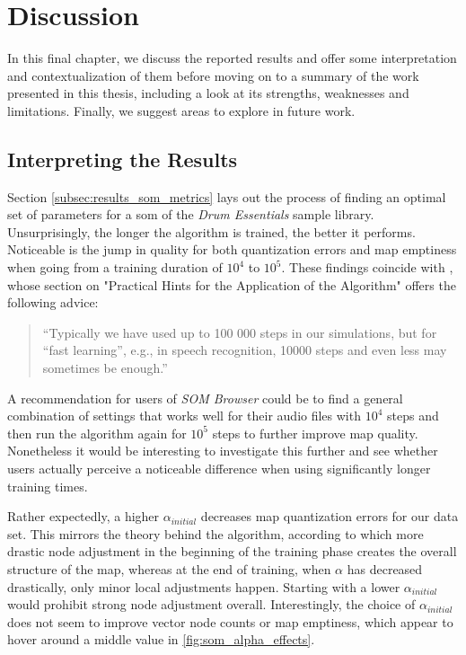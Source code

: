 
\section{Discussion}
\label{sec:discussion}
In this final chapter, we discuss the reported results and offer some
interpretation and contextualization of them before moving on to a summary of
the work presented in this thesis, including a look at its strengths, weaknesses
and limitations. Finally, we suggest areas to explore in future work.

\subsection{Interpreting the Results}
\label{subsec:discussion_results_interpretation}

Section \ref{subsec:results_som_metrics} lays out the process of finding an
optimal set of parameters for a \gls{som} of the \textit{Drum Essentials} sample
library. Unsurprisingly, the longer the algorithm is trained, the better it
performs. Noticeable is the jump in quality for both quantization errors and
map emptiness when going from a training duration of $10^4$ to $10^5$. These
findings coincide with \citet{kohonen1990}, whose section on "Practical Hints
for the Application of the Algorithm" offers the following advice:

\begin{quotation}
“Typically we have used up to 100 000 steps in our simulations, but for
“fast learning”, e.g., in speech recognition, 10000 steps and even less may
sometimes be enough.”
\end{quotation}

A recommendation for users of \textit{SOM Browser} could be to find a general
combination of settings that works well for their audio files with $10^4$ steps
and then run the algorithm again for $10^5$ steps to further improve map
quality. Nonetheless it would be interesting to investigate this further and
see whether users actually perceive a noticeable difference when using
significantly longer training times.

\smallskip

Rather expectedly, a higher $\alpha_{initial}$ decreases map quantization errors
for our data set. This mirrors the theory behind the algorithm, according to
which more drastic node adjustment in the beginning of the training phase
creates the overall structure of the map, whereas at the end of training, when
$\alpha$ has decreased drastically, only minor local adjustments happen.
Starting with a lower $\alpha_{initial}$ would prohibit strong node adjustment
overall. Interestingly, the choice of $\alpha_{initial}$ does not seem to
improve vector node counts or map emptiness, which appear to hover around a
middle value in \ref{fig:som_alpha_effects}.

